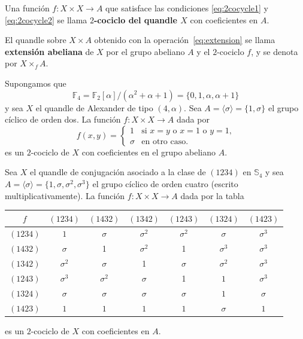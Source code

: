 \documentclass[graybox]{svmult}
\newcommand{\F}{\mathbb{F}}
\newcommand{\Sym}{\mathbb{S}}
\begin{document}
	\begin{definition}
		Una función $f:X\times X\to A$ que satisface las condiciones
		\eqref{eq:2cocycle1} y \eqref{eq:2cocycle2} se llama \textbf{$2$-cociclo
		del quandle $X$} con coeficientes en $A$.  
	\end{definition}

	\begin{definition} 
		El quandle sobre $X\times A$ obtenido con la operación~\eqref{eq:extension} se 
		llama \textbf{extensión abeliana} de $X$ por el grupo abeliano $A$ y el
		$2$-cociclo $f$, y se denota por $X\times_{f}A$.  
	\end{definition}

\begin{example}
    \label{exa:T:2cocycle}
    Supongamos que
    \[
        \F_4=\F_2[\alpha]/(\alpha^2+\alpha+1)=\{0,1,\alpha,\alpha+1\}
    \]
    y sea $X$
    el quandle de Alexander de tipo $(4,\alpha)$.  Sea
    $A=\langle\sigma\rangle=\{1,\sigma\}$ el grupo cíclico de orden dos. La
    función $f\colon X\times X\to A$ dada por 
    \[
    f(x,y)=\begin{cases}
        1 & \text{si $x=y$ o $x=1$ o $y=1$,}\\
        \sigma & \text{en otro caso.}
    \end{cases}
    \]
    es un $2$-cociclo de $X$ con coeficientes en el grupo abeliano $A$. 
\end{example}

\begin{example}
    \label{exa:4cyclesS4}
    Sea $X$ el quandle de conjugación asociado a la clase de $(1234)$ en $\Sym_4$ y sea
    $A=\langle\sigma\rangle=\{1,\sigma,\sigma^2,\sigma^3\}$ el grupo cíclico de
    orden cuatro (escrito multiplicativamente).  La función $f\colon X\times
    X\to A$ dada por la tabla
    \begin{center}
        \begin{tabular}{c|cccccc}
            $f$ & $(1234)$ & $(1432)$ & $(1342)$ & $(1243)$ & $(1324)$ & $(1423)$\tabularnewline
            \hline 
            $(1234)$ & $1$ & $\sigma$ & $\sigma^2$ & $\sigma^2$ &  $\sigma$ & $\sigma^3$\rule{0pt}{3ex}\\ 
            $(1432)$  & $\sigma$ &     1 & $\sigma^2$ &     1 & $\sigma^3$ & $\sigma^3$\\
            $(1342)$ & $\sigma^2$ &  $\sigma$ &     1 &  $\sigma$ & $\sigma^2$ & $\sigma^3$\\
            $(1243)$ & $\sigma^3$ &  $\sigma^2$ &  $\sigma$ &     1 &     $1$ & $\sigma^3$\\
            $(1324)$ & $\sigma$ &  $\sigma$ &  $\sigma$ &  $\sigma$ &     $1$ &  $\sigma$\\
            $(1423)$ & $1$ &     $1$ &     $1$ &     $1$ &  $\sigma$ &     $1$
        \end{tabular}
    \end{center}
    es un $2$-cociclo de $X$ con coeficientes en $A$.
\end{example}
\end{document}
